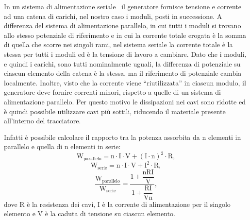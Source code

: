 In un sistema di alimentazione seriale~\cite{SLDO} il generatore fornisce tensione e corrente ad una catena di carichi, nel nostro caso i moduli, posti in successione. A differenza del sistema di alimentazione parallelo, in cui tutti i moduli si trovano allo stesso potenziale di riferimento e in cui la corrente totale erogata è la somma di quella che scorre nei singoli rami, nel sistema seriale la corrente totale è la stessa per tutti i moduli ed è la tensione di lavoro a cambiare. Dato che i moduli, e quindi i carichi, sono tutti nominalmente uguali, la differenza di potenziale su ciascun elemento della catena è la stessa, ma il riferimento di potenziale cambia localmente.
Inoltre, visto che la corrente viene ``riutilizzata'' in ciascun modulo, il generatore deve fornire correnti minori, rispetto a quelle di un sistema di alimentazione parallelo.
Per questo motivo le dissipazioni nei cavi sono ridotte ed è quindi possibile utilizzare cavi più sottili, riducendo il materiale presente all'interno del tracciatore.

Infatti è possibile calcolare il rapporto tra la potenza assorbita da n elementi in parallelo e quella di n elementi in serie:
\begin{equation}
\mathrm{W_{parallelo} = n \cdot I \cdot V + (I\cdot n)^2 \cdot R},
\end{equation}
\begin{equation}
\mathrm{W_{serie} = n \cdot I \cdot V + I^2 \cdot R},
\end{equation}
\begin{equation}
\mathrm{\frac{W_{parallelo}}{W_{serie}} = \frac{1+ \dfrac{nRI}{V}}{1+\dfrac{RI}{Vn}}},
\end{equation}
dove R è la resistenza dei cavi, I è la corrente di alimentazione per il singolo elemento e V è la caduta di tensione su ciascun elemento. 

